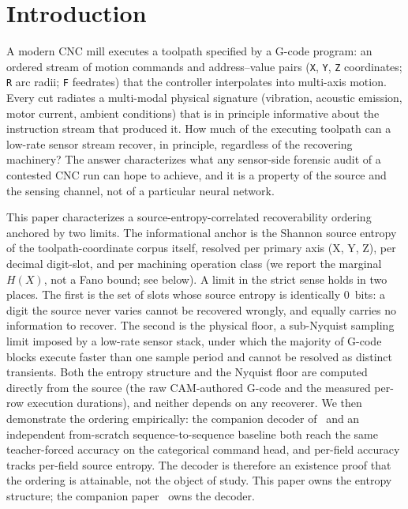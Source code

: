 \documentclass[entropy,article,submit,moreauthors,pdftex]{Definitions/mdpi}
\begin{document}
\section{Introduction}
\label{sec:intro}

A modern CNC mill executes a toolpath specified by a G-code program: an ordered stream of motion commands and address--value pairs (\texttt{X}, \texttt{Y}, \texttt{Z} coordinates; \texttt{R} arc radii; \texttt{F} feedrates) that the controller interpolates into multi-axis motion. Every cut radiates a multi-modal physical signature (vibration, acoustic emission, motor current, ambient conditions) that is in principle informative about the instruction stream that produced it. How much of the executing toolpath can a low-rate sensor stream recover, in principle, regardless of the recovering machinery? The answer characterizes what any sensor-side forensic audit of a contested CNC run can hope to achieve, and it is a property of the source and the sensing channel, not of a particular neural network.

This paper characterizes a source-entropy-correlated recoverability ordering anchored by two limits. The informational anchor is the Shannon source entropy of the toolpath-coordinate corpus itself, resolved per primary axis (X, Y, Z), per decimal digit-slot, and per machining operation class (we report the marginal $H(X)$, not a Fano bound; see below). A limit in the strict sense holds in two places. The first is the set of slots whose source entropy is identically $0$~bits: a digit the source never varies cannot be recovered wrongly, and equally carries no information to recover. The second is the physical floor, a sub-Nyquist sampling limit imposed by a low-rate sensor stack, under which the majority of G-code blocks execute faster than one sample period and cannot be resolved as distinct transients. Both the entropy structure and the Nyquist floor are computed directly from the source (the raw CAM-authored G-code and the measured per-row execution durations), and neither depends on any recoverer. We then demonstrate the ordering empirically: the companion decoder of~\cite{paperA_decoder} and an independent from-scratch sequence-to-sequence baseline both reach the same teacher-forced accuracy on the categorical command head, and per-field accuracy tracks per-field source entropy. The decoder is therefore an existence proof that the ordering is attainable, not the object of study. This paper owns the entropy structure; the companion paper~\cite{paperA_decoder} owns the decoder.
\end{document}
